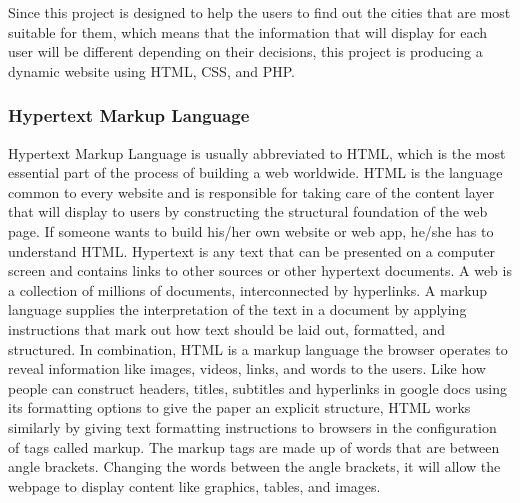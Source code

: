 \documentclass[10pt,twocolumn]{article}
\begin{document}
\indent
Since this project is designed to help the users to find out the cities that are most suitable for them, which means that the information that will display for each user will be different depending on their decisions, this project is producing a dynamic website using HTML, CSS, and PHP.  

\subsubsection{Hypertext Markup Language}
Hypertext Markup Language is usually abbreviated to HTML, which is the most essential part of the process of building a web worldwide. HTML is the language common to every website and is responsible for taking care of the content layer that will display to users by constructing the structural foundation of the web page\cite{Dean2019}. If someone wants to build his/her own website or web app, he/she has to understand HTML. 
\newline
\indent
Hypertext is any text that can be presented on a computer screen and contains links to other sources or other hypertext documents. A web is a collection of millions of documents, interconnected by hyperlinks. A markup language supplies the interpretation of the text in a document by applying instructions that mark out how text should be laid out, formatted, and structured. In combination, HTML is a markup language the browser operates to reveal information like images, videos, links, and words to the users. Like how people can construct headers, titles, subtitles and hyperlinks in google docs using its formatting options to give the paper an explicit structure, HTML works similarly by giving text formatting instructions to browsers in the configuration of tags called markup. The markup tags are made up of words that are between angle brackets. Changing the words between the angle brackets, it will allow the webpage to display content like graphics, tables, and images. 
\end{document}
